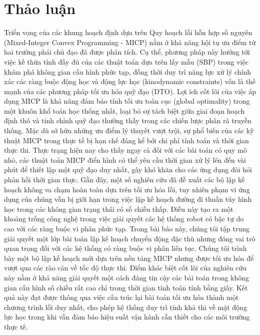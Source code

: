 \section{Thảo luận}
Triển vọng của các khung hoạch định dựa trên Quy hoạch lồi hỗn hợp số nguyên (Mixed-Integer Convex Programming - MICP) nằm ở khả năng hội tụ ưu điểm từ hai trường phái chủ đạo đã được phân tích. Cụ thể, phương pháp này hướng tới việc kế thừa tính đầy đủ của các thuật toán dựa trên lấy mẫu (SBP) trong việc khám phá không gian cấu hình phức tạp, đồng thời duy trì năng lực xử lý chính xác các ràng buộc động học và động lực học (kinodynamic constraints) vốn là thế mạnh của các phương pháp tối ưu hóa quỹ đạo (DTO). Lợi ích cốt lõi của việc áp dụng MICP là khả năng đảm bảo tính tối ưu toàn cục (global optimality) trong một khuôn khổ toán học thống nhất, loại bỏ sự tách biệt giữa giai đoạn hoạch định thô và tinh chỉnh quỹ đạo thường thấy trong các chiến lược phân rã truyền thống. Mặc dù sở hữu những ưu điểm lý thuyết vượt trội, sự phổ biến của các kỹ thuật MICP trong thực tế bị hạn chế đáng kể bởi chi phí tính toán và thời gian thực thi. Thực trạng hiện nay cho thấy ngay cả đối với các bài toán có quy mô nhỏ, các thuật toán MICP điển hình có thể yêu cầu thời gian xử lý lên đến vài phút để thiết lập một quỹ đạo duy nhất, gây khó khăn cho các ứng dụng đòi hỏi phản hồi thời gian thực. Gần đây, một số nghiên cứu đã đề xuất các bộ lập kế hoạch không va chạm hoàn toàn dựa trên tối ưu hóa lồi, tuy nhiên phạm vi ứng dụng của chúng vẫn bị giới hạn trong việc lập kế hoạch đường đi thuần túy hình học trong các không gian trạng thái có số chiều thấp. Điều này tạo ra một khoảng trống công nghệ trong việc giải quyết các hệ thống robot có bậc tự do cao với các ràng buộc vi phân phức tạp. Trong bài báo này, chúng tôi tập trung giải quyết một lớp bài toán lập kế hoạch chuyển động đặc thù nhưng đóng vai trò quan trọng đối với các hệ thống có ràng buộc vi phân liên tục. Chúng tôi trình bày một bộ lập kế hoạch mới dựa trên nền tảng MICP nhưng được tối ưu hóa để vượt qua các rào cản về tốc độ thực thi. Điểm khác biệt cốt lõi của nghiên cứu này nằm ở khả năng giải quyết một cách đáng tin cậy các bài toán trong không gian cấu hình số chiều rất cao chỉ trong thời gian tính toán tính bằng giây. Kết quả này đạt được thông qua việc cấu trúc lại bài toán tối ưu hóa thành một chương trình lồi duy nhất, cho phép hệ thống duy trì tính khả thi về mặt động lực học trong khi vẫn đảm bảo hiệu suất vận hành cần thiết cho các môi trường thực tế.
